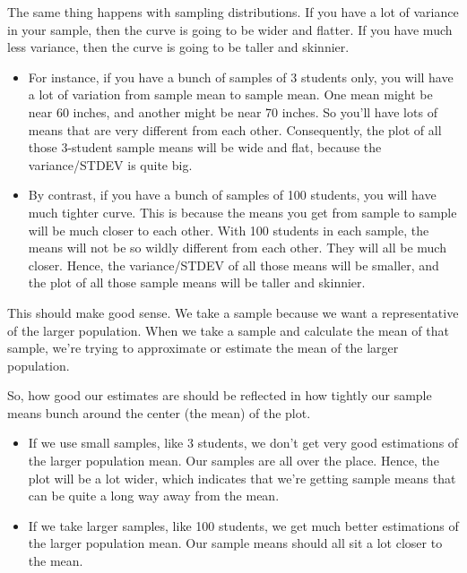 \documentclass[../../../main.tex]{subfiles}
\begin{document}
\noindent
The same thing happens with sampling distributions. If you have a lot of variance in your sample, then the curve is going to be wider and flatter. If you have much less variance, then the curve is going to be taller and skinnier. 

\begin{itemize}

  \item For instance, if you have a bunch of samples of 3 students only, you will have a lot of variation from sample mean to sample mean. One mean might be near 60 inches, and another might be near 70 inches. So you'll have lots of means that are very different from each other. Consequently, the plot of all those 3-student sample means will be wide and flat, because the variance/STDEV is quite big.
  
  \item By contrast, if you have a bunch of samples of 100 students, you will have much tighter curve. This is because the means you get from sample to sample will be much closer to each other. With 100 students in each sample, the means will not be so wildly different from each other. They will all be much closer. Hence, the variance/STDEV of all those means will be smaller, and the plot of all those sample means will be taller and skinnier. 
  
\end{itemize}

\noindent
This should make good sense. We take a sample because we want a representative of the larger population. When we take a sample and calculate the mean of that sample, we're trying to approximate or estimate the mean of the larger population. 

So, how good our estimates are should be reflected in how tightly our sample means bunch around the center (the mean) of the plot.

\begin{itemize}

  \item If we use small samples, like 3 students, we don't get very good estimations of the larger population mean. Our samples are all over the place. Hence, the plot will be a lot wider, which indicates that we're getting sample means that can be quite a long way away from the mean.
  
  \item If we take larger samples, like 100 students, we get much better estimations of the larger population mean. Our sample means should all sit a lot closer to the mean.

\end{itemize}
\end{document}
